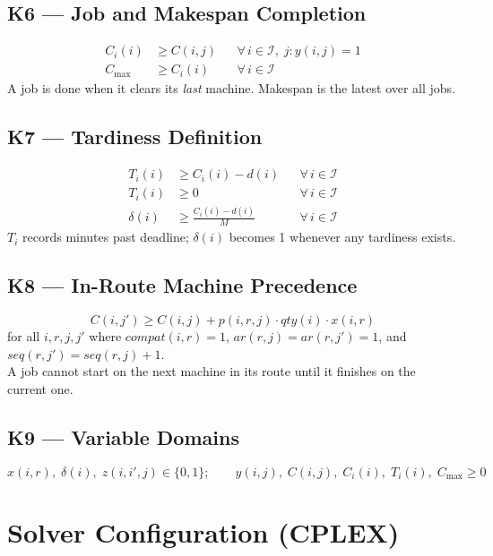 \documentclass[11pt,a4paper]{article}
\begin{document}
\subsection{K6 — Job and Makespan Completion}
\begin{align}
  C_i(i) &\geq C(i,j) &&\forall\, i \in \mathcal{I},\; j : y(i,j)=1 \\
  C_{\max} &\geq C_i(i) &&\forall\, i \in \mathcal{I}
\end{align}
A job is done when it clears its \emph{last} machine. Makespan is the latest over all jobs.

\subsection{K7 — Tardiness Definition}
\begin{align}
  T_i(i) &\geq C_i(i) - d(i) &&\forall\, i \in \mathcal{I} \\
  T_i(i) &\geq 0               &&\forall\, i \in \mathcal{I} \\
  \delta(i) &\geq \frac{C_i(i) - d(i)}{M} &&\forall\, i \in \mathcal{I}
\end{align}
$T_i$ records minutes past deadline; $\delta(i)$ becomes 1 whenever any tardiness exists.

\subsection{K8 — In-Route Machine Precedence}
\begin{equation}
  C(i,j') \geq C(i,j) + p(i,r,j)\cdot\mathit{qty}(i)\cdot x(i,r)
\end{equation}
for all $i,r,j,j'$ where $\mathit{compat}(i,r)=1$, $\mathit{ar}(r,j)=\mathit{ar}(r,j')=1$,
and $\mathit{seq}(r,j')=\mathit{seq}(r,j)+1$.\\
A job cannot start on the next machine in its route until it finishes on the current one.

\subsection{K9 — Variable Domains}
\begin{equation}
  x(i,r),\;\delta(i),\;z(i,i',j) \in \{0,1\};
  \qquad
  y(i,j),\;C(i,j),\;C_i(i),\;T_i(i),\;C_{\max} \geq 0
\end{equation}

\section{Solver Configuration (CPLEX)}
\end{document}
